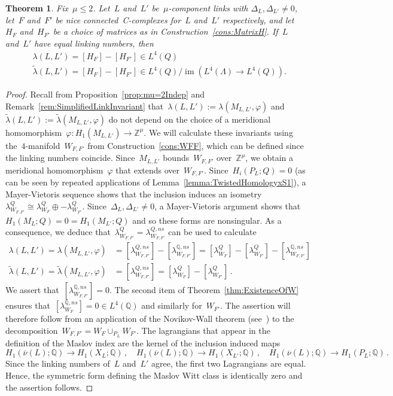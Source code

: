 \documentclass[10.9pt,a4paper]{amsart}
\newtheorem{theorem}{Theorem}[section]
\theoremstyle{definition}
\theoremstyle{remark}
\newcommand{\Z}{\mathbb{Z}}
\newcommand{\Q}{\mathbb{Q}}
\newcommand{\im}{\operatorname{im}}
\begin{document}
\begin{theorem}
\label{thm:Calculation}
Fix~$\mu\le 2$. Let~$L$ and~$L'$ be~$\mu$-component links with $\Delta_L,\Delta_{L'} \neq 0$, let~$F$ and~$F'$ be nice connected~C-complexes for~$L$ and~$L'$ respectively, and let~$H_F$ and~$H_{F'}$ be a choice of matrices as in Construction~\ref{cons:MatrixH}.
If~$L$ and~$L'$ have equal linking numbers, then 
\begin{align*}
&\lambda(L,L')=[H_F]-[H_{F'}] \in L^4(Q) \\
&\widetilde{\lambda}(L,L')=[H_F]-[H_{F'}] \in L^4(Q)/\im(L^4(\Lambda) \to L^4(Q)).
\end{align*}
\end{theorem}
\begin{proof}
Recall from Proposition~\ref{prop:mu=2Indep} and Remark~\ref{rem:SimplifiedLinkInvariant} that~$\lambda(L,L'):=\lambda(M_{L,L'},\varphi)$ and~$\widetilde{\lambda}(L,L'):=\widetilde{\lambda}(M_{L,L'},\varphi)$
do not depend on the choice of a meridional homomorphism~$\varphi \colon H_1(M_{L,L'}) \to \Z^\mu$.
We will calculate these invariants using %
the~$4$-manifold~$W_{F,F'}$ from Construction~\ref{cons:WFF}, which can be defined since the linking numbers coincide.
Since~$M_{L,L'}$ bounds~$W_{F,F'}$ over~$\Z^\mu$, we obtain a meridional homomorphism~$\varphi$ that extends over~$W_{F,F'}$.
Since~$H_i(P_L;Q)=0$ (as can be seen by repeated applications of Lemma~\ref{lemma:TwistedHomologyxS1}),
a Mayer-Vietoris sequence shows that the inclusion induces an isometry~$\lambda_{W_{F,F'}}^Q \cong \lambda_{W_F}^Q \oplus -\lambda_{W_{F'}}^Q$.
Since~$\Delta_L,\Delta_{L'} \neq 0$, a Mayer-Vietoris argument shows that~$H_1(M_L;Q)=0=H_1(M_{L'};Q)$ and so these forms are nonsingular.
As a consequence, we deduce that~$\lambda_{W_{F,F'}}^Q=\lambda_{W_{F,F'}}^{Q,\textit{ns}}$ can be used to calculate
\begin{align*}
\lambda(L,L')=\lambda(M_{L,L'},\varphi)
&=[\lambda_{W_{F,F'}}^{Q,\textit{ns}}]-[\lambda_{W_{F,F'}}^{\Q,\textit{ns}}]=[\lambda_{W_F}^Q]-[\lambda_{W_{F'}}^Q]-[\lambda_{W_{F,F'}}^{\Q,\textit{ns}}] \\
\widetilde{\lambda}(L,L')=
\widetilde{\lambda}(M_{L,L'},\varphi)
&=[\lambda_{W_{F,F'}}^{Q,\textit{ns}}]
=[\lambda_{W_F}^Q]-[\lambda_{W_{F'}}^Q]\,.
\end{align*}
We assert that~$[\lambda_{W_{F,F'}}^{\Q,\textit{ns}}]=0$.
The second item of Theorem~\ref{thm:ExistenceOfW} ensures that~$[\lambda_{W_F}^{\Q,\textit{ns}}]=0 \in L^4(\Q)$ and similarly for~$W_{F'}$.
The assertion will therefore follow from an application of the Novikov-Wall theorem
(see~\cite{Wall}) to the decomposition~$W_{F,F'}=W_F\cup_{P_L} W_{F'}$.
The lagrangians that appear in the definition of the Maslov index are the kernel of the inclusion induced maps
\[
H_1(\overline{\nu}(L);\Q) \to H_1(X_L;\Q)\,,\quad H_1(\overline{\nu}(L);\Q) \to H_1(X_{L'};\Q)\,,\quad H_1(\overline{\nu}(L);\Q) \to H_1(P_L;\Q)\,.
\]
Since the linking numbers of~$L$ and~$L'$ agree, the first two Lagrangians are equal.
Hence, the symmetric form defining the Maslov Witt class is identically zero and the assertion follows.


\end{proof}
\end{document}
